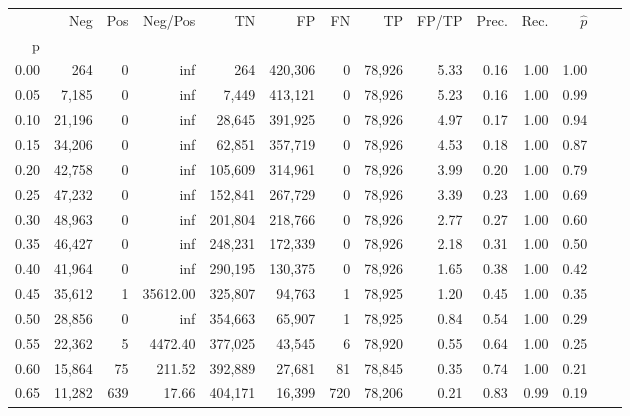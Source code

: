 \begin{tabular}{rrrrrrrrrrrrrr}
\toprule
{} &     Neg &     Pos &   Neg/Pos &       TN &       FP &      FN &      TP & FP/TP & Prec. &  Rec. & $\hat{p}$ \\
p    &         &         &           &          &          &         &         &       &       &       &           \\
\midrule
0.00 &     264 &       0 &       inf &      264 &  420,306 &       0 &  78,926 &  5.33 &  0.16 &  1.00 &      1.00 \\
0.05 &   7,185 &       0 &       inf &    7,449 &  413,121 &       0 &  78,926 &  5.23 &  0.16 &  1.00 &      0.99 \\
0.10 &  21,196 &       0 &       inf &   28,645 &  391,925 &       0 &  78,926 &  4.97 &  0.17 &  1.00 &      0.94 \\
0.15 &  34,206 &       0 &       inf &   62,851 &  357,719 &       0 &  78,926 &  4.53 &  0.18 &  1.00 &      0.87 \\
0.20 &  42,758 &       0 &       inf &  105,609 &  314,961 &       0 &  78,926 &  3.99 &  0.20 &  1.00 &      0.79 \\
0.25 &  47,232 &       0 &       inf &  152,841 &  267,729 &       0 &  78,926 &  3.39 &  0.23 &  1.00 &      0.69 \\
0.30 &  48,963 &       0 &       inf &  201,804 &  218,766 &       0 &  78,926 &  2.77 &  0.27 &  1.00 &      0.60 \\
0.35 &  46,427 &       0 &       inf &  248,231 &  172,339 &       0 &  78,926 &  2.18 &  0.31 &  1.00 &      0.50 \\
0.40 &  41,964 &       0 &       inf &  290,195 &  130,375 &       0 &  78,926 &  1.65 &  0.38 &  1.00 &      0.42 \\
0.45 &  35,612 &       1 &  35612.00 &  325,807 &   94,763 &       1 &  78,925 &  1.20 &  0.45 &  1.00 &      0.35 \\
0.50 &  28,856 &       0 &       inf &  354,663 &   65,907 &       1 &  78,925 &  0.84 &  0.54 &  1.00 &      0.29 \\
0.55 &  22,362 &       5 &   4472.40 &  377,025 &   43,545 &       6 &  78,920 &  0.55 &  0.64 &  1.00 &      0.25 \\
0.60 &  15,864 &      75 &    211.52 &  392,889 &   27,681 &      81 &  78,845 &  0.35 &  0.74 &  1.00 &      0.21 \\
0.65 &  11,282 &     639 &     17.66 &  404,171 &   16,399 &     720 &  78,206 &  0.21 &  0.83 &  0.99 &      0.19 \\

\end{tabular}
